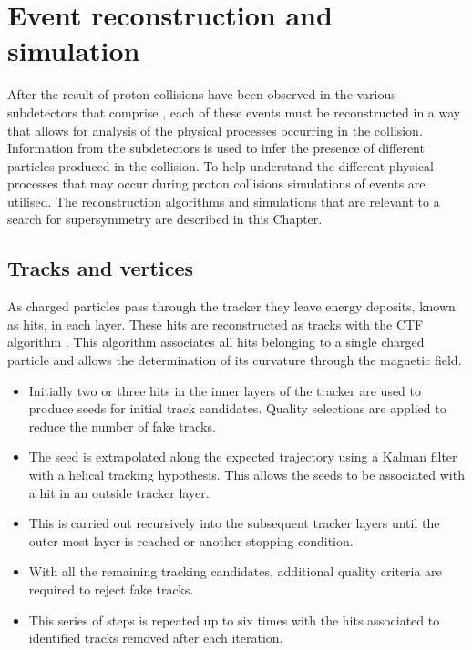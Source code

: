 \chapter{Event reconstruction and simulation}
\label{chap:reconstruction}

After the result of proton collisions have been observed in the
various subdetectors that comprise \CMS, each of these events must be
reconstructed in a way that allows for analysis of the physical
processes occurring in the collision. Information from the
subdetectors is used to infer the presence of different particles
produced in the collision. To help understand the different physical
processes that may occur during \LHC proton collisions \MC simulations
of events are utilised. The reconstruction algorithms and simulations
that are relevant to a search for supersymmetry are described in this
Chapter.

\section{Tracks and vertices}
\label{sec:tracks_reco}

As charged particles pass through the \CMS tracker they leave energy
deposits, known as hits, in each layer. These
hits are reconstructed as tracks with the \ac{CTF}
algorithm \cite{Chatrchyan:2014fea}. This algorithm associates all
hits belonging to a single charged particle and allows the
determination of its curvature through the magnetic field.

\begin{itemize}
\item{Initially two or three hits in the inner layers of the tracker
are used to produce seeds for initial track candidates. Quality
selections are applied to reduce the number of fake tracks.} 
\item{The seed is extrapolated along the expected trajectory using a
Kalman filter \cite{Fruhwirth:1987fm} with a helical tracking
hypothesis.  This allows the seeds to be associated with a hit in an
outside tracker layer.} 
\item{This is carried out recursively into the subsequent tracker
layers until the outer-most layer is reached or another stopping
condition.} 
\item{With all the remaining tracking candidates, additional quality
criteria are required to reject fake tracks.}
\item{This series of steps is repeated up to six times with the hits
associated to identified tracks removed after each iteration. }
\end{itemize}


